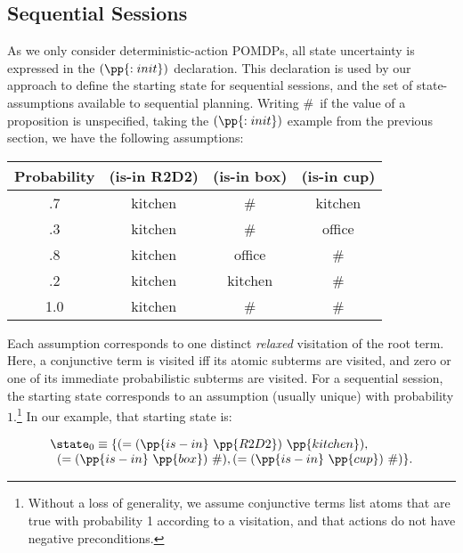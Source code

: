 \subsection{Sequential Sessions}

As we only consider deterministic-action POMDPs, all state
uncertainty is expressed in the $(\pp{:init})$ declaration. This
declaration is used by our approach to define the starting state for
sequential sessions, and the set of state-assumptions available to
sequential planning.  Writing \#\ if the value of a proposition is
unspecified, taking the $(\pp{:init})$ example from the previous
section, we have the following assumptions:

\small
\begin{tabular}{cccc}
\hline
Probability & (is-in R2D2)  & (is-in box)  & (is-in cup) \\
\hline
.7 & kitchen & \# &  kitchen\\
.3 & kitchen & \# & office \\
.8 & kitchen & office & \# \\
.2 & kitchen & kitchen & \# \\
1.0 & kitchen & \# & \# \\
\hline
\end{tabular}
\normalsize

\noindent Each assumption corresponds to one distinct {\em
relaxed} visitation of the root term. Here, a conjunctive term is
visited iff its atomic subterms are visited, and zero or one of its
immediate probabilistic subterms are visited. For a sequential
session, the starting state corresponds to an assumption (usually
unique) with probability $1$.\footnote{Without a loss of generality,
we assume conjunctive terms list atoms that are true with
probability 1 according to a visitation, and that actions do not
have negative preconditions.}  In our example, that starting state is:

\vspace{-1ex}

\small
\[
\begin{array}{l}
\state_0 \equiv \{(=(\pp{is-in}~\pp{R2D2})~\pp{kitchen}),\\
\;\;(=(\pp{is-in}~\pp{box})~\#), (=(\pp{is-in}~\pp{cup})~\#)\}.
\end{array}
\]
\normalsize

\vspace{-1ex}


